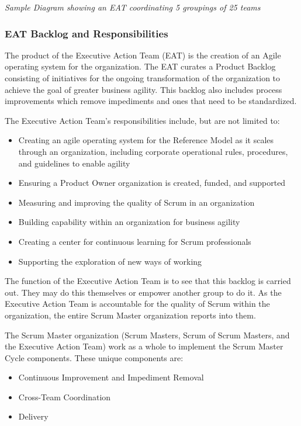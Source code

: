 \documentclass[12pt,a4paper,parskip=full]{scrartcl}
\begin{document}
\emph{Sample Diagram showing an EAT coordinating 5 groupings of 25
teams}

\subsubsection{EAT Backlog and
Responsibilities}\label{EAT-backlog-and-responsibilities}

The product of the Executive Action Team (EAT) is the creation of an Agile operating system for the organization. The EAT curates a Product Backlog consisting of initiatives for the ongoing transformation of the organization to achieve the goal of greater business agility. This backlog also includes process improvements which remove impediments and ones that need to be standardized.

The Executive Action Team's responsibilities include, but are not
limited to:

\begin{itemize}
\itemsep1pt\parskip0pt
\item
  Creating an agile operating system for the Reference Model as it scales through an organization, including corporate operational rules, procedures, and guidelines to enable agility
\item
 Ensuring a Product Owner organization is created, funded, and supported
\item
  Measuring and improving the quality of Scrum in an organization
\item
  Building capability within an organization for business agility
\item
  Creating a center for continuous learning for Scrum professionals
\item
  Supporting the exploration of new ways of working
\end{itemize}

The function of the Executive Action Team is to see that this backlog is carried out. They may do this themselves or empower another group to do it. As the Executive Action Team is accountable for the quality of Scrum within the organization, the entire Scrum Master organization reports into them.

The Scrum Master organization (Scrum Masters, Scrum of Scrum Masters, and the Executive Action Team) work as a whole to implement the Scrum Master Cycle components. These unique components are:


\begin{itemize}
\itemsep1pt\parskip0pt
\item
  Continuous Improvement and Impediment Removal
\item
  Cross-Team Coordination
\item
  Delivery
\end{itemize}
\end{document}
